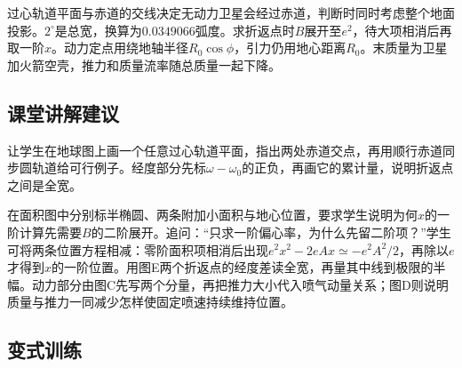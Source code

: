 \documentclass[UTF8,fontset=fandol,a4paper,11pt]{ctexart}
\begin{document}
过心轨道平面与赤道的交线决定无动力卫星会经过赤道，判断时同时考虑整个地面投影。$2^\circ$是总宽，换算为$0.0349066$弧度。求折返点时$B$展开至$e^2$，待大项相消后再取一阶$x$。动力定点用绕地轴半径$R_0\cos\phi$，引力仍用地心距离$R_0$。末质量为卫星加火箭空壳，推力和质量流率随总质量一起下降。



\subsection*{课堂讲解建议}

让学生在地球图上画一个任意过心轨道平面，指出两处赤道交点，再用顺行赤道同步圆轨道给可行例子。经度部分先标$\omega-\omega_0$的正负，再画它的累计量，说明折返点之间是全宽。

在面积图中分别标半椭圆、两条附加小面积与地心位置，要求学生说明为何$x$的一阶计算先需要$B$的二阶展开。追问：“只求一阶偏心率，为什么先留二阶项？”学生可将两条位置方程相减：零阶面积项相消后出现$e^2x^2-2eAx\simeq-e^2A^2/2$，再除以$e$才得到$x$的一阶位置。用图E两个折返点的经度差读全宽，再量其中线到极限的半幅。动力部分由图C先写两个分量，再把推力大小代入喷气动量关系；图D则说明质量与推力一同减少怎样使固定喷速持续维持位置。



\subsection*{变式训练}
\end{document}
